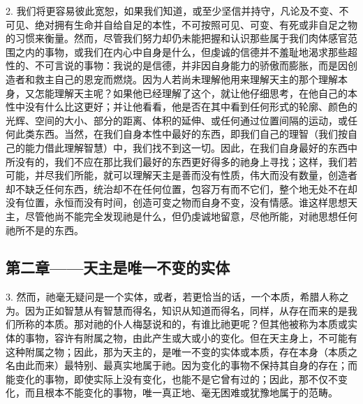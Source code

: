 2. 我们将更容易彼此宽恕，如果我们知道，或至少坚信并持守，凡论及不变、不可见、绝对拥有生命并自给自足的本性，不可按照可见、可变、有死或非自足之物的习惯来衡量。然而，尽管我们努力却仍未能把握和认识那些属于我们肉体感官范围之内的事物，或我们在内心中自身是什么，但虔诚的信德并不羞耻地渴求那些超性的、不可言说的事物：我说的是信德，并非因自身能力的骄傲而膨胀，而是因创造者和救主自己的恩宠而燃烧。因为人若尚未理解他用来理解天主的那个理解本身，又怎能理解天主呢？如果他已经理解了这个，就让他仔细思考，在他自己的本性中没有什么比这更好；并让他看看，他是否在其中看到任何形式的轮廓、颜色的光辉、空间的大小、部分的距离、体积的延伸、或任何通过位置间隔的运动，或任何此类东西。当然，在我们自身本性中最好的东西，即我们自己的理智（我们按自己的能力借此理解智慧）中，我们找不到这一切。因此，在我们自身最好的东西中所没有的，我们不应在那比我们最好的东西更好得多的祂身上寻找；这样，我们若可能，并尽我们所能，就可以理解天主是善而没有性质，伟大而没有数量，创造者却不缺乏任何东西，统治却不在任何位置，包容万有而不它们，整个地无处不在却没有位置，永恒而没有时间，创造可变之物而自身不变，没有情感。谁这样思想天主，尽管他尚不能完全发现祂是什么，但仍虔诚地留意，尽他所能，对祂思想任何祂所不是的东西。\par


\subsection{第二章——天主是唯一不变的实体}

3. 然而，祂毫无疑问是一个实体，或者，若更恰当的话，一个本质，希腊人称之为。因为正如智慧从有智慧而得名，知识从知道而得名，同样，从存在而来的是我们所称的本质。那对祂的仆人梅瑟说和的，有谁比祂更呢？但其他被称为本质或实体的事物，容许有附属之物，由此产生或大或小的变化。但在天主身上，不可能有这种附属之物；因此，那为天主的，是唯一不变的实体或本质，存在本身（本质之名由此而来）最特别、最真实地属于祂。因为变化的事物不保持其自身的存在；而能变化的事物，即使实际上没有变化，也能不是它曾有过的；因此，那不仅不变化，而且根本不能变化的事物，唯一真正地、毫无困难或犹豫地属于的范畴。\par


